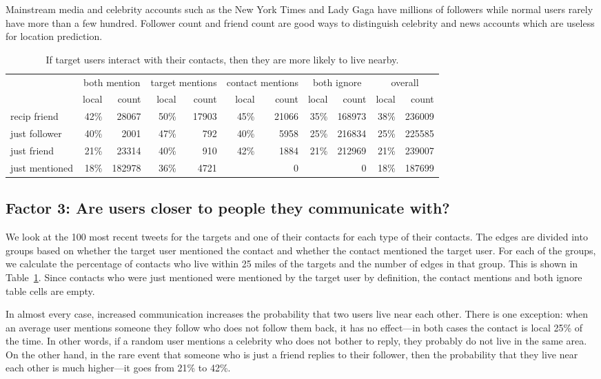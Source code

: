 \documentclass{sig-alternate}
\begin{document}
Mainstream media and celebrity accounts such as the New York Times and Lady
Gaga have millions of followers while normal users rarely have more than a few
hundred.
%
Follower count and friend count are good ways to distinguish celebrity and news
accounts which are useless for location prediction.


\begin{table}[tb]
\scriptsize
\centering
\begin{tabular}{l | r r | r r | r r | r r | r r}
    & \multicolumn{2}{c}{both mention}
    & \multicolumn{2}{|c}{target mentions}
    & \multicolumn{2}{|c}{contact mentions}
    & \multicolumn{2}{|c}{both ignore}
    & \multicolumn{2}{|c}{overall} \\
    \cline{2-11}
    &local&count&local&count&local&count&local&count&local&count \\
    \hline
    recip friend & 42\%&28067 & 50\%&17903 & 45\%&21066 & 35\%&168973 & 38\%&236009 \\
    just follower & 40\%&2001 & 47\%&792 & 40\%&5958 & 25\%&216834 & 25\%&225585 \\
    just friend & 21\%&23314 & 40\%&910 & 42\%&1884 & 21\%&212969 & 21\%&239007 \\
    just mentioned & 18\%&182978 & 36\%&4721 & & 0 & & 0 & 18\%&187699 \\
\end{tabular}
\caption{
If target users interact with their contacts, then they are more likely to
live nearby.
}
\label{tab:ComTypes}
\end{table}

\subsection{Factor 3: Are users closer to people they communicate with?}

We look at the 100 most recent tweets for the targets and one of their
contacts for each type of their contacts.
%
The edges are divided into groups based on whether the target user
mentioned the contact and whether the contact mentioned the target user.
%
For each of the groups, we calculate the percentage of contacts who
live within 25 miles of the targets and the number of edges in that group.
%
This is shown in Table~\ref{tab:ComTypes}.
%
Since contacts who were just mentioned were mentioned by the target
user by definition, the contact mentions and both ignore table cells are
empty.

In almost every case, increased communication increases the probability that
two users live near each other.
%
There is one exception: when an average user mentions someone they follow who
does not follow them back, it has no effect---in both cases the contact is
local 25\% of the time.
%
In other words, if a random user mentions a celebrity who does not bother to
reply, they probably do not live in the same area.
%
On the other hand, in the rare event that someone who is just a friend replies
to their follower, then the probability that they live near each other is much
higher---it goes from 21\% to 42\%.
\end{document}
